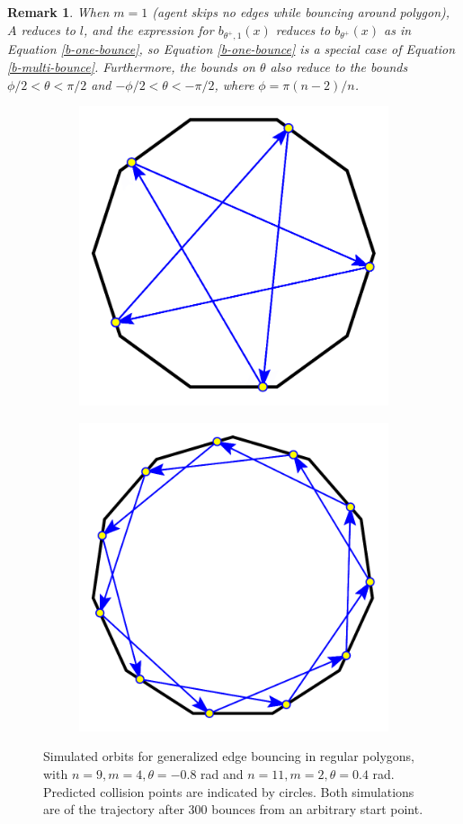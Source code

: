 \documentclass[letterpaper, 10 pt, conference]{ieeeconf}  %
\newtheorem{remark}{\bf Remark}
\begin{document}
\begin{remark} When $m=1$ (agent skips no edges while bouncing around polygon), $A$
reduces to $l$, and the expression for $b_{\theta^+, 1}(x)$ reduces to
$b_{\theta^+}(x)$ as in Equation \ref{b-one-bounce}, so Equation
\ref{b-one-bounce} is a special case of Equation \ref{b-multi-bounce}.
Furthermore, the bounds on $\theta$ also reduce to the bounds $\phi/2 < \theta < \pi/2$ and $-\phi/2 < \theta < -\pi/2$, where $\phi=\pi(n-2)/n$.
\end{remark}

\begin{figure}[th]
\begin{subfigure}{.25\textwidth}
\centering

\includegraphics[width=0.7\linewidth]{figs/nonagon_neg0pt8rad_skip3.pdf}

\end{subfigure}%
\begin{subfigure}{0.25\textwidth}

\includegraphics[width=0.7\linewidth]{figs/eleven_limit_m2.pdf}

\end{subfigure}

\caption{Simulated orbits for generalized edge bouncing in
regular polygons, with $n=9, m=4, \theta=-0.8$ rad and $n=11, m=2, \theta=0.4$
rad. Predicted collision points are indicated by circles. Both simulations are of the trajectory after 300 bounces
from an arbitrary start point. \label{ccw-m-bounce}}
\end{figure}
\end{document}
